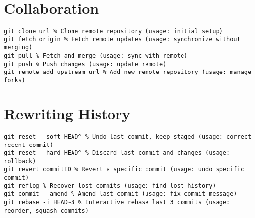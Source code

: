 \documentclass[a4paper,10pt]{article}
\begin{document}
\section{Collaboration}
\begin{lstlisting}
git clone url % Clone remote repository (usage: initial setup)
git fetch origin % Fetch remote updates (usage: synchronize without merging)
git pull % Fetch and merge (usage: sync with remote)
git push % Push changes (usage: update remote)
git remote add upstream url % Add new remote repository (usage: manage forks)
\end{lstlisting}

\section{Rewriting History}
\begin{lstlisting}
git reset --soft HEAD^ % Undo last commit, keep staged (usage: correct recent commit)
git reset --hard HEAD^ % Discard last commit and changes (usage: rollback)
git revert commitID % Revert a specific commit (usage: undo specific commit)
git reflog % Recover lost commits (usage: find lost history)
git commit --amend % Amend last commit (usage: fix commit message)
git rebase -i HEAD~3 % Interactive rebase last 3 commits (usage: reorder, squash commits)
\end{lstlisting}
\end{document}
